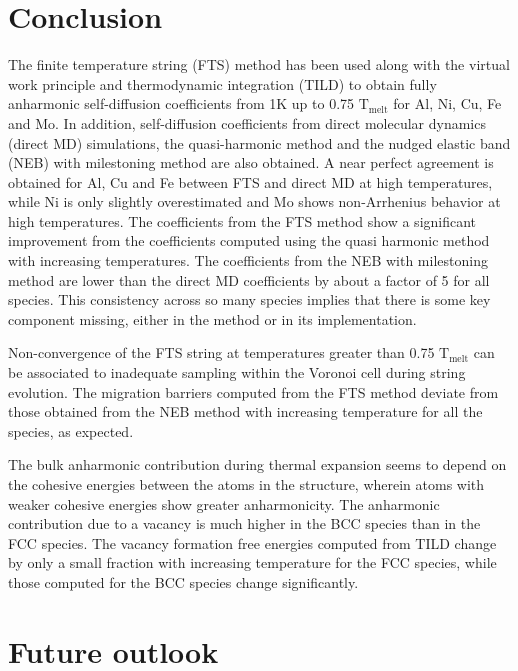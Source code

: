 \documentclass{article}
\begin{document}
\clearpage
\section{Conclusion}

The finite temperature string (FTS) method has been used along with the virtual work principle and thermodynamic integration (TILD) to obtain fully anharmonic self-diffusion coefficients from 1K up to 0.75 $\mathrm{T_{melt}}$ for Al, Ni, Cu, Fe and Mo. In addition, self-diffusion coefficients from direct molecular dynamics (direct MD) simulations, the quasi-harmonic method and the nudged elastic band (NEB) with milestoning method are also obtained. A near perfect agreement is obtained for Al, Cu and Fe between FTS and direct MD at high temperatures, while Ni is only slightly overestimated and Mo shows non-Arrhenius behavior at high temperatures. The coefficients from the FTS method show a significant improvement from the coefficients computed using the quasi harmonic method with increasing temperatures. The coefficients from the NEB with milestoning method are lower than the direct MD coefficients by about a factor of 5 for all species. This consistency across so many species implies that there is some key component missing, either in the method or in its implementation.

Non-convergence of the FTS string at temperatures greater than 0.75 $\mathrm{T_{melt}}$ can be associated to inadequate sampling within the Voronoi cell during string evolution. The migration barriers computed from the FTS method deviate from those obtained from the NEB method with increasing temperature for all the species, as expected.

The bulk anharmonic contribution during thermal expansion seems to depend on the cohesive energies between the atoms in the structure, wherein atoms with weaker cohesive energies show greater anharmonicity. The anharmonic contribution due to a vacancy is much higher in the BCC species than in the FCC species. The vacancy formation free energies computed from TILD change by only a small fraction with increasing temperature for the FCC species, while those computed for the BCC species change significantly. \\


\clearpage
\section{Future outlook}
\end{document}
